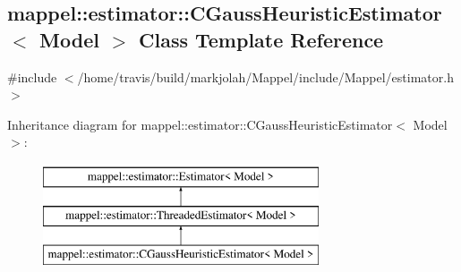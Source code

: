 \hypertarget{classmappel_1_1estimator_1_1CGaussHeuristicEstimator}{}\subsection{mappel\+:\+:estimator\+:\+:C\+Gauss\+Heuristic\+Estimator$<$ Model $>$ Class Template Reference}
\label{classmappel_1_1estimator_1_1CGaussHeuristicEstimator}


{\ttfamily \#include $<$/home/travis/build/markjolah/\+Mappel/include/\+Mappel/estimator.\+h$>$}

Inheritance diagram for mappel\+:\+:estimator\+:\+:C\+Gauss\+Heuristic\+Estimator$<$ Model $>$\+:\begin{figure}[H]
\begin{center}
\leavevmode
\includegraphics[height=3.000000cm]{classmappel_1_1estimator_1_1CGaussHeuristicEstimator}
\end{center}
\end{figure}

